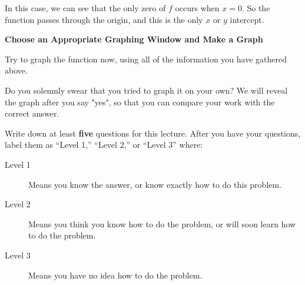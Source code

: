 \documentclass{ximera}
\begin{document}
\begin{question}
  In this case, we can see that the only zero of $f$ occurs when $x=0$.  So the function passes through the origin, and this is the only $x$ or $y$ intercept.
  
  \textbf{Choose an Appropriate Graphing Window and Make a Graph}
  
  Try to graph the function now, using all of the information you have gathered above.  
  
  
  \begin{solution}
  
  Do you solemnly swear that you tried to graph it on your own?  We will reveal the graph after you say "yes", so that you can compare your work with the correct answer.
  
  	\begin{multipleChoice}
    \end{multipleChoice}

  \end{solution}
  
       
\begin{image}
\end{image}


  
  
  Write down at least \textbf{five} questions for this lecture. After
you have your questions, label them as ``Level 1,'' ``Level 2,'' or ``Level 3'' where:
\begin{description}
\item[Level 1] Means you know the answer, or know exactly how to do this problem.
\item[Level 2] Means you think you know how to do the problem, or will soon learn how to do the problem.
\item[Level 3] Means you have no idea how to do the problem. 
\end{description}

  \begin{freeResponse}
  \end{freeResponse}
  
  
  
  
\end{question}
\end{document}
